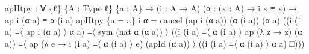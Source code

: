 \documentclass[
  11pt,
  oneside,
  article]{memoir}
\newenvironment{Shaded}{}{}
\newcommand{\NormalTok}[1]{#1}
\newcommand{\OtherTok}[1]{\textcolor[rgb]{0.00,0.44,0.13}{#1}}
\theoremstyle{definition}
\theoremstyle{plain}
\newcommand{\0}{\textsf{0}}
\newcommand{\1}{\tn{\textsf{1}}}
\begin{document}
\begin{Shaded}
\begin{Highlighting}[]
\NormalTok{apHtpy }\OtherTok{:} \OtherTok{∀} \OtherTok{\{}\NormalTok{ℓ}\OtherTok{\}} \OtherTok{\{}\NormalTok{A }\OtherTok{:}\NormalTok{ Type ℓ}\OtherTok{\}} \OtherTok{\{}\NormalTok{a }\OtherTok{:}\NormalTok{ A}\OtherTok{\}}
         \OtherTok{→} \OtherTok{(}\NormalTok{i }\OtherTok{:}\NormalTok{ A }\OtherTok{→}\NormalTok{ A}\OtherTok{)} \OtherTok{(}\NormalTok{α }\OtherTok{:} \OtherTok{(}\NormalTok{x }\OtherTok{:}\NormalTok{ A}\OtherTok{)} \OtherTok{→}\NormalTok{ i x ≡ x}\OtherTok{)}
         \OtherTok{→}\NormalTok{ ap i }\OtherTok{(}\NormalTok{α a}\OtherTok{)}\NormalTok{ ≡ α }\OtherTok{(}\NormalTok{i a}\OtherTok{)}
\NormalTok{apHtpy }\OtherTok{\{}\NormalTok{a }\OtherTok{=}\NormalTok{ a}\OtherTok{\}}\NormalTok{ i α }\OtherTok{=} 
\NormalTok{    cancel }\OtherTok{(}\NormalTok{ap i }\OtherTok{(}\NormalTok{α a}\OtherTok{))} \OtherTok{(}\NormalTok{α }\OtherTok{(}\NormalTok{i a}\OtherTok{))} \OtherTok{(}\NormalTok{α a}\OtherTok{)} 
           \OtherTok{((}\NormalTok{i }\OtherTok{(}\NormalTok{i a}\OtherTok{)}\NormalTok{ ≡〈 ap i }\OtherTok{(}\NormalTok{α a}\OtherTok{)}\NormalTok{ 〉 α a}\OtherTok{)} 
\NormalTok{           ≡〈 sym }\OtherTok{(}\NormalTok{nat α }\OtherTok{(}\NormalTok{α a}\OtherTok{))}\NormalTok{ 〉 }
           \OtherTok{((}\NormalTok{i }\OtherTok{(}\NormalTok{i a}\OtherTok{)}\NormalTok{ ≡〈 α }\OtherTok{(}\NormalTok{i a}\OtherTok{)}\NormalTok{ 〉 ap }\OtherTok{(λ}\NormalTok{ z }\OtherTok{→}\NormalTok{ z}\OtherTok{)} \OtherTok{(}\NormalTok{α a}\OtherTok{))} 
\NormalTok{           ≡〈 ap }\OtherTok{(λ}\NormalTok{ e }\OtherTok{→}\NormalTok{ i }\OtherTok{(}\NormalTok{i a}\OtherTok{)}\NormalTok{ ≡〈 α }\OtherTok{(}\NormalTok{i a}\OtherTok{)}\NormalTok{ 〉 e}\OtherTok{)} \OtherTok{(}\NormalTok{apId }\OtherTok{(}\NormalTok{α a}\OtherTok{))}\NormalTok{ 〉 }
           \OtherTok{((}\NormalTok{i }\OtherTok{(}\NormalTok{i a}\OtherTok{)}\NormalTok{ ≡〈 α }\OtherTok{(}\NormalTok{i a}\OtherTok{)}\NormalTok{ 〉 α a}\OtherTok{)}\NormalTok{ □}\OtherTok{)))}


\end{Highlighting}
\end{Shaded}
\end{document}
